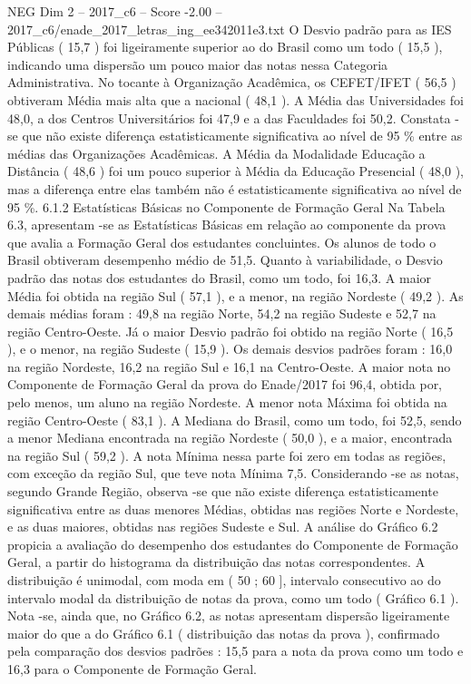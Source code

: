 \begin{textsample}{NEG Dim 2 – 2017\_c6 – Score -2.00 – 2017\_c6/enade\_2017\_letras\_ing\_ee342011e3.txt}
O Desvio padrão para as IES Públicas ( 15,7 ) foi ligeiramente superior ao do Brasil como um todo ( 15,5 ), indicando uma dispersão um pouco maior das notas nessa Categoria Administrativa.
No tocante à Organização Acadêmica, os CEFET/IFET ( 56,5 ) obtiveram Média mais alta que a nacional ( 48,1 ).
A Média das Universidades foi 48,0, a dos Centros Universitários foi 47,9 e a das Faculdades foi 50,2.
Constata -se que não existe diferença estatisticamente significativa ao nível de 95 \% entre as médias das Organizações Acadêmicas.
A Média da Modalidade Educação a Distância ( 48,6 ) foi um pouco superior à Média da Educação Presencial ( 48,0 ), mas a diferença entre elas também não é estatisticamente significativa ao nível de 95 \%. 6.1.2 Estatísticas Básicas no Componente de Formação Geral Na Tabela 6.3, apresentam -se as Estatísticas Básicas em relação ao componente da prova que avalia a Formação Geral dos estudantes concluintes.
Os alunos de todo o Brasil obtiveram desempenho médio de 51,5.
Quanto à variabilidade, o Desvio padrão das notas dos estudantes do Brasil, como um todo, foi 16,3.
A maior Média foi obtida na região Sul ( 57,1 ), e a menor, na região Nordeste ( 49,2 ).
As demais médias foram : 49,8 na região Norte, 54,2 na região Sudeste e 52,7 na região Centro-Oeste.
Já o maior Desvio padrão foi obtido na região Norte ( 16,5 ), e o menor, na região Sudeste ( 15,9 ).
Os demais desvios padrões foram : 16,0 na região Nordeste, 16,2 na região Sul e 16,1 na Centro-Oeste.
A maior nota no Componente de Formação Geral da prova do Enade/2017 foi 96,4, obtida por, pelo menos, um aluno na região Nordeste.
A menor nota Máxima foi obtida na região Centro-Oeste ( 83,1 ).
A Mediana do Brasil, como um todo, foi 52,5, sendo a menor Mediana encontrada na região Nordeste ( 50,0 ), e a maior, encontrada na região Sul ( 59,2 ).
A nota Mínima nessa parte foi zero em todas as regiões, com exceção da região Sul, que teve nota Mínima 7,5.
Considerando -se as notas, segundo Grande Região, observa -se que não existe diferença estatisticamente significativa entre as duas menores Médias, obtidas nas regiões Norte e Nordeste, e as duas maiores, obtidas nas regiões Sudeste e Sul.
A análise do Gráfico 6.2 propicia a avaliação do desempenho dos estudantes do Componente de Formação Geral, a partir do histograma da distribuição das notas correspondentes.
A distribuição é unimodal, com moda em ( 50 ; 60 ], intervalo consecutivo ao do intervalo modal da distribuição de notas da prova, como um todo ( Gráfico 6.1 ).
Nota -se, ainda que, no Gráfico 6.2, as notas apresentam dispersão ligeiramente maior do que a do Gráfico 6.1 ( distribuição das notas da prova ), confirmado pela comparação dos desvios padrões : 15,5 para a nota da prova como um todo e 16,3 para o Componente de Formação Geral.

\end{textsample}
